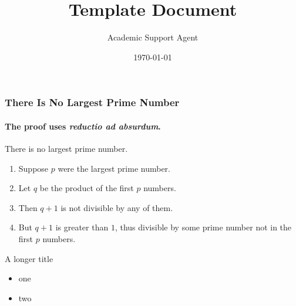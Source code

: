 \documentclass{article}
\title{Template Document}
\author{Academic Support Agent}
\date{\today}
\begin{document}
\maketitle

\begin{frame}
\titlepage
\end{frame}

\begin{frame} 
\frametitle{There Is No Largest Prime Number} 
\framesubtitle{The proof uses \textit{reductio ad absurdum}.} 
\begin{theorem}
There is no largest prime number. \end{theorem} 
\begin{enumerate} 
\item<1-| alert@1> Suppose $p$ were the largest prime number. 
\item<2-> Let $q$ be the product of the first $p$ numbers. 
\item<3-> Then $q+1$ is not divisible by any of them. 
\item<1-> But $q + 1$ is greater than $1$, thus divisible by some prime
number not in the first $p$ numbers.
\end{enumerate}
\end{frame}

\begin{frame}{A longer title}
\begin{itemize}
\item one
\item two
\end{itemize}
\end{frame}
\end{document}
